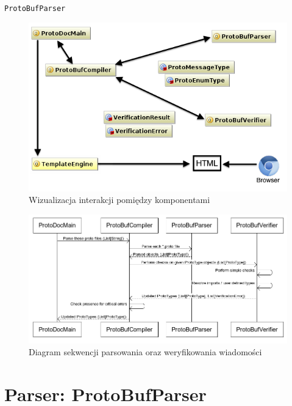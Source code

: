 \documentclass[pdflatex,11pt]{aghdpl}
\begin{document}
\verb|ProtoBufParser|

\begin{figure}[ch]
\begin{center}
 \includegraphics[width=\textwidth]{main_classes.png}
\end{center}
\label{simple_visualization}
\caption{Wizualizacja interakcji pomiędzy komponentami}
\end{figure}

\begin{figure}[ch]
\begin{center}
 \includegraphics[width=\textwidth]{compile_sequence}
\end{center}
\label{sequence_diagram_parsing}
\caption{Diagram sekwencji parsowania oraz weryfikowania wiadomości}
\end{figure}




\section{Parser: ProtoBufParser}
\end{document}
